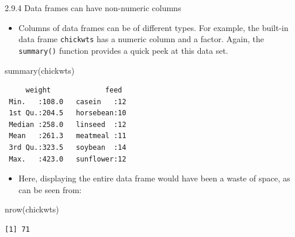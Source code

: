 \documentclass[
  9pt,
  a4paper,
  ignorenonframetext,
  notheorems]{beamer}
\newenvironment{Shaded}{\begin{snugshade}}{\end{snugshade}}
\newcommand{\FunctionTok}[1]{\textcolor[rgb]{0.28,0.35,0.67}{#1}}
\newcommand{\NormalTok}[1]{\textcolor[rgb]{0.00,0.23,0.31}{#1}}
\providecommand{\tightlist}{%
  \setlength{\itemsep}{0pt}\setlength{\parskip}{0pt}}\usepackage{longtable,booktabs,array}
\begin{document}
\begin{frame}[fragile]
\begin{block}{2.9.4 Data frames can have non-numeric columns}
\protect\hypertarget{data-frames-can-have-non-numeric-columns}{}
\begin{itemize}
\tightlist
\item
  Columns of data frames can be of different types. For example, the
  built-in data frame \texttt{chickwts} has a numeric column and a
  factor. Again, the \texttt{summary()} function provides a quick peek
  at this data set.
\end{itemize}

\begin{Shaded}
\begin{Highlighting}[]
\FunctionTok{summary}\NormalTok{(chickwts)}
\end{Highlighting}
\end{Shaded}

\begin{verbatim}
     weight             feed   
 Min.   :108.0   casein   :12  
 1st Qu.:204.5   horsebean:10  
 Median :258.0   linseed  :12  
 Mean   :261.3   meatmeal :11  
 3rd Qu.:323.5   soybean  :14  
 Max.   :423.0   sunflower:12  
\end{verbatim}

\begin{itemize}
\tightlist
\item
  Here, displaying the entire data frame would have been a waste of
  space, as can be seen from:
\end{itemize}

\begin{Shaded}
\begin{Highlighting}[]
\FunctionTok{nrow}\NormalTok{(chickwts)}
\end{Highlighting}
\end{Shaded}

\begin{verbatim}
[1] 71
\end{verbatim}
\end{block}
\end{frame}
\end{document}
